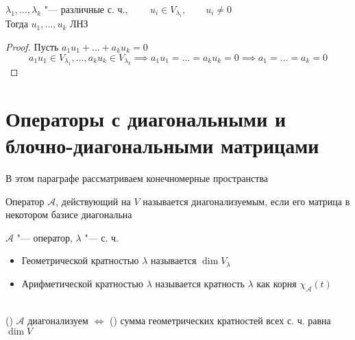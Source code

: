 \begin{implication}
	$ \lambda_1, \dots, \lambda_k $ "--- различные с. ч., $ \qquad u_i \in V_{\lambda_i}, \qquad u_i \ne 0 $ \\
	Тогда $ u_1, \dots, u_k $ ЛНЗ
\end{implication}

\begin{proof}
	Пусть $ a_1u_1 + \dots + a_ku_k = 0 $
	$$ a_1u_1 \in V_{\lambda_1}, \dots, a_ku_k \in V_{\lambda_k} \implies a_1u_1 = \dots = a_ku_k = 0 \implies a_1 = \dots = a_k = 0 $$
\end{proof}

\section{Операторы с диагональными и блочно-диагональными матрицами}

В этом параграфе рассматриваем конечномерные пространства

\begin{definition}
	Оператор $ \mathcal{A} $, действующий на $ V $ называется диагонализуемым, если его матрица в некотором базисе диагональна
\end{definition}

\begin{definition}
	$ \mathcal{A} $ "--- оператор, $ \lambda $ "--- с. ч.
	\begin{itemize}
		\item Геометрической кратностью $ \lambda $ называется $ \dim V_\lambda $
		\item Арифметической кратностью $ \lambda $ называется кратность $ \lambda $ как корня $ \chi_{\mathcal{A}}(t) $
	\end{itemize}
\end{definition}

\begin{theorem}
	\hfill \\
	() $ \mathcal{A} $ диагонализуем $ \iff $ () сумма геометрических кратностей всех с. ч. равна $ \dim V $
\end{theorem}

